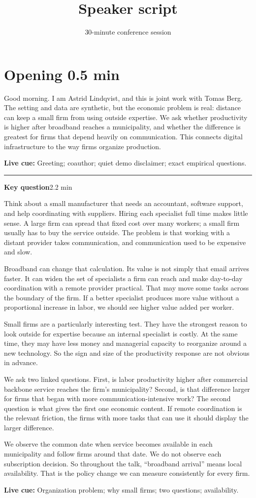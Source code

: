 \documentclass[11pt]{article}
\title{Speaker script\\[0.25em]\large \PaperFullTitle}
\author{\ScriptAuthors}
\date{30-minute conference session \quad \VenueDate}
\newcommand{\Cue}[1]{\par\nobreak\smallskip\noindent\textcolor{ScriptGray}{\footnotesize
  \textbf{Live cue:} #1}\par}
\newcommand{\scriptopening}[2]{%
  \Needspace{10\baselineskip}%
  \section*{Opening \hfill\normalfont\small\textcolor{ScriptGray}{#1}}
  #2\par}
\newcommand{\scriptframe}[3]{%
  \Needspace{11\baselineskip}%
  \par\medskip\noindent\textcolor{ScriptBlue}{\rule{\linewidth}{0.55pt}}%
  \par\smallskip\noindent
  \textbf{#1}\hfill\textcolor{ScriptGray}{\small #2}\par\smallskip
  #3\par}
\begin{document}
\maketitle
\thispagestyle{fancy}

\scriptopening{0.5 min}{%
  Good morning. I am Astrid Lindqvist, and this is joint work with Tomas Berg.
  The setting and data are synthetic, but the economic problem is real:
  distance can keep a small firm from using outside expertise. We ask whether
  productivity is higher after broadband reaches a municipality, and whether
  the difference is greatest for firms that depend heavily on communication.
  This connects digital infrastructure to the way firms organize production.
  \Cue{Greeting; coauthor; quiet demo disclaimer; exact empirical questions.}
}

\scriptframe{Key question}{2.2 min}{%
  Think about a small manufacturer that needs an accountant, software support,
  and help coordinating with suppliers. Hiring each specialist full time makes
  little sense. A large firm can spread that fixed cost over many workers; a
  small firm usually has to buy the service outside. The problem is that
  working with a distant provider takes communication, and communication used
  to be expensive and slow.

  Broadband can change that calculation. Its value is not simply that email
  arrives faster. It can widen the set of specialists a firm can reach and make
  day-to-day coordination with a remote provider practical. That may move some
  tasks across the boundary of the firm. If a better specialist produces more
  value without a proportional increase in labor, we should see higher value
  added per worker.

  Small firms are a particularly interesting test. They have the strongest
  reason to look outside for expertise because an internal specialist is
  costly. At the same time, they may have less money and managerial capacity to
  reorganize around a new technology. So the sign and size of the productivity
  response are not obvious in advance.

  We ask two linked questions. First, is labor productivity higher after
  commercial backbone service reaches the firm's municipality? Second, is
  that difference larger for firms that began with more
  communication-intensive work? The second question is what gives the first
  one economic content. If remote coordination is the relevant friction, the
  firms with more tasks that can use it should display the larger difference.

  We observe the common date when service becomes available in each
  municipality and follow firms around that date. We do not observe each
  subscription decision. So throughout the talk, ``broadband arrival'' means
  local availability. That is the policy change we can measure consistently
  for every firm.
  \Cue{Organization problem; why small firms; two questions; availability.}
}
\end{document}
